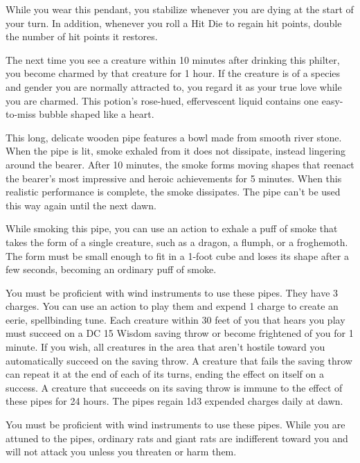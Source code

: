 \documentclass[10pt,a4paper,twoside,bg=print,twocolumn,openany,nodeprecatedcode]{dndbook}
\begin{document}
While you wear this pendant, you stabilize whenever you are dying at the start of your turn. In addition, whenever you roll a Hit Die to regain hit points, double the number of hit points it restores.

The next time you see a creature within 10 minutes after drinking this philter, you become charmed by that creature for 1 hour. If the creature is of a species and gender you are normally attracted to, you regard it as your true love while you are charmed. This potion's rose-hued, effervescent liquid contains one easy-to-miss bubble shaped like a heart.

This long, delicate wooden pipe features a bowl made from smooth river stone. When the pipe is lit, smoke exhaled from it does not dissipate, instead lingering around the bearer. After 10 minutes, the smoke forms moving shapes that reenact the bearer's most impressive and heroic achievements for 5 minutes. When this realistic performance is complete, the smoke dissipates. The pipe can't be used this way again until the next dawn.

While smoking this pipe, you can use an action to exhale a puff of smoke that takes the form of a single creature, such as a dragon, a flumph, or a froghemoth. The form must be small enough to fit in a 1-foot cube and loses its shape after a few seconds, becoming an ordinary puff of smoke.

You must be proficient with wind instruments to use these pipes. They have 3 charges. You can use an action to play them and expend 1 charge to create an eerie, spellbinding tune. Each creature within 30 feet of you that hears you play must succeed on a DC 15 Wisdom saving throw or become frightened of you for 1 minute. If you wish, all creatures in the area that aren't hostile toward you automatically succeed on the saving throw. A creature that fails the saving throw can repeat it at the end of each of its turns, ending the effect on itself on a success. A creature that succeeds on its saving throw is immune to the effect of these pipes for 24 hours. The pipes regain 1d3 expended charges daily at dawn.

You must be proficient with wind instruments to use these pipes. While you are attuned to the pipes, ordinary rats and giant rats are indifferent toward you and will not attack you unless you threaten or harm them.
\end{document}
